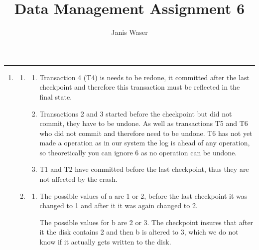 \documentclass[12pt]{extarticle}
\title{Data Management Assignment 6}
\author{Janis Waser}
\begin{document}
\maketitle \vspace{-10mm}
\rule{\linewidth}{0.4pt}


\begin{flushleft}
\begin{enumerate}[label=\textbf{\Alph*.}]

\item 
\begin{enumerate}[label=\arabic*.]
\item \begin{enumerate}[label=(\alph*)]
\item Transaction 4 (T4) is needs to be redone, it committed after the last checkpoint and therefore this transaction must be reflected in the final state.
\item Transactions 2 and 3 started before the checkpoint but did not commit, they have to be undone. As well as transactions T5 and T6 who did not commit and therefore need to be undone. T6 has not yet made a operation as in our system the log is ahead of any operation, so theoretically you can ignore 6 as no operation can be undone.
\item T1 and T2 have committed before the last checkpoint, thus they are not affected by the crash.
\end{enumerate}
 \item \begin{enumerate}[label=(\alph*)] 
\item The possible values of a are 1 or 2, before the last checkpoint it was changed to 1 and after it it was again changed to 2. 

The possible values for b are 2 or 3. The checkpoint insures that after it the disk contains 2 and then b is altered to 3, which we do not know if it actually gets written to the disk. 


\end{enumerate}
\end{enumerate}
\end{enumerate}
\end{flushleft}
\end{document}
